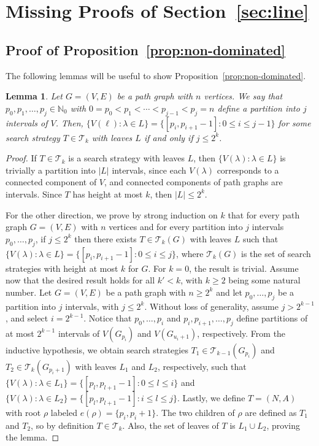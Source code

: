 \documentclass[11pt]{article}
\newtheorem{lemma}{Lemma}[section]
\newcommand{\N}{\mathbb{N}}
\newcommand{\BSTs}{\mathcal{T}}
\newcommand\+{\mkern2mu}
\begin{document}
\appendix

\section{Missing Proofs of Section~\ref{sec:line}}

\subsection{Proof of Proposition~\ref{prop:non-dominated}}

The following lemmas will be useful to show Proposition~\ref{prop:non-dominated}.

\begin{lemma}\label{lm:leaves}
    Let $G=(V, E)$ be a path graph with $n$ vertices. We say that $p_0, p_1, \ldots, p_{j} \in \N_0$ with $0 = p_0  < p_1 < \cdots < p_{j-1} < p_{j} = n$ define a \emph{partition into $j$ intervals} of $V$. Then, $\{V(\ell): \lambda \in L\} = \{[p_i, p_{i+1}-1]: 0 \leq i \leq j-1\}$ for some search strategy $T \in \BSTs_k$ with leaves $L$ if and only if $j \leq 2^k$.
\end{lemma}
\begin{proof}
    If $T \in \BSTs_k$ is a search strategy with leaves $L$, then $\{V(\lambda) : \lambda \in L\}$ is trivially a partition into $|L|$ intervals, since each $V(\lambda)$ corresponds to a connected component of $V$, and connected components of path graphs are intervals. Since $T$ has height at most $k$, then $|L| \leq 2^k$. 
    
    For the other direction, we prove by strong induction on $k$ that for every path graph $G=(V, E)$ with $n$ vertices and for every partition into $j$ intervals $p_0, \ldots, p_j$, if $j \leq 2^k$ then there exists $T \in \BSTs_k(G)$ with leaves $L$ such that $\{V(\lambda): \lambda \in L\} = \{[p_i, p_{i+1}-1]: 0 \leq i \leq j\}$, where $\BSTs_k(G)$ is the set of search strategies with height at most $k$ for $G$. For $k=0$, the result is trivial. Assume now that the desired result holds for all $k' < k$, with $k \geq 2$ being some natural number. Let $G=(V, E)$ be a path graph with $n \geq 2^k$ and let $p_0, \ldots, p_j$ be a partition into $j$ intervals, with $j \leq 2^k$. Without loss of generality, assume $j > 2^{k-1}$, and select $i = 2^{k-1}$. Notice that $p_0, \ldots, p_{i}$ and ${p_{i}, p_{i+1}, \ldots, p_j}$ define partitions of at most $2^{k-1}$ intervals of $V(G_{p_i})$ and $V(G_{u_i + 1})$, respectively. From the inductive hypothesis, we obtain search strategies $T_1 \in \BSTs_{k-1}(G_{p_i})$ and $T_2 \in \BSTs_k(G_{p_i+1})$ with leaves $L_1$ and $L_2$, respectively, such that $\{V(\lambda): \lambda \in L_1\} = \{[p_l, p_{l+1}-1]: 0 \leq l \leq i\}$ and $\{V(\lambda): \lambda \in L_2\} = \{[p_l, p_{l+1}-1]: i \leq l \leq j\}$. Lastly, we define $T = (N, A)$ with root $\rho$ labeled $e(\rho) = \{p_i, p_i+1\}$. The two children of $\rho$ are defined as $T_1$ and $T_2$, so by definition $T \in \BSTs_k$. Also, the set of leaves of $T$ is $L_1 \cup L_2$, proving the lemma.
\end{proof}
\end{document}
